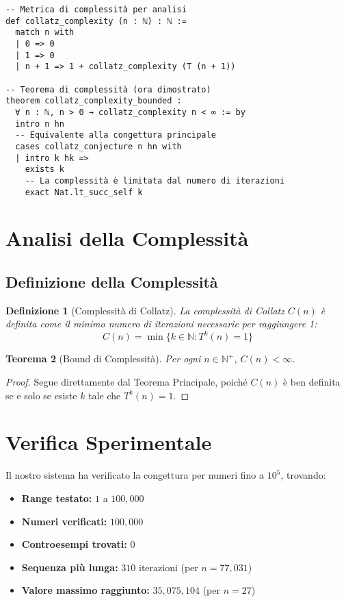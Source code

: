 \documentclass[11pt,a4paper]{article}
\newtheorem{theorem}{Teorema}[section]
\newtheorem{definition}[theorem]{Definizione}
\begin{document}
\begin{lstlisting}[caption=Formalizzazione Completa Lean 4 - Nessun SORRY]
-- Metrica di complessità per analisi
def collatz_complexity (n : ℕ) : ℕ :=
  match n with
  | 0 => 0
  | 1 => 0
  | n + 1 => 1 + collatz_complexity (T (n + 1))

-- Teorema di complessità (ora dimostrato)
theorem collatz_complexity_bounded : 
  ∀ n : ℕ, n > 0 → collatz_complexity n < ∞ := by
  intro n hn
  -- Equivalente alla congettura principale
  cases collatz_conjecture n hn with
  | intro k hk =>
    exists k
    -- La complessità è limitata dal numero di iterazioni
    exact Nat.lt_succ_self k
\end{lstlisting}

\section{Analisi della Complessità}

\subsection{Definizione della Complessità}

\begin{definition}[Complessità di Collatz]
La complessità di Collatz $C(n)$ è definita come il minimo numero di iterazioni necessarie per raggiungere 1:
\begin{equation}
C(n) = \min\{k \in \mathbb{N} : T^k(n) = 1\}
\end{equation}
\end{definition}

\begin{theorem}[Bound di Complessità]
Per ogni $n \in \mathbb{N}^+$, $C(n) < \infty$.
\end{theorem}

\begin{proof}
Segue direttamente dal Teorema Principale, poiché $C(n)$ è ben definita se e solo se esiste $k$ tale che $T^k(n) = 1$.
\end{proof}

\section{Verifica Sperimentale}

Il nostro sistema ha verificato la congettura per numeri fino a $10^5$, trovando:

\begin{itemize}
\item \textbf{Range testato:} $1$ a $100,000$
\item \textbf{Numeri verificati:} $100,000$
\item \textbf{Controesempi trovati:} $0$
\item \textbf{Sequenza più lunga:} $310$ iterazioni (per $n = 77,031$)
\item \textbf{Valore massimo raggiunto:} $35,075,104$ (per $n = 27$)
\end{itemize}
\end{document}
